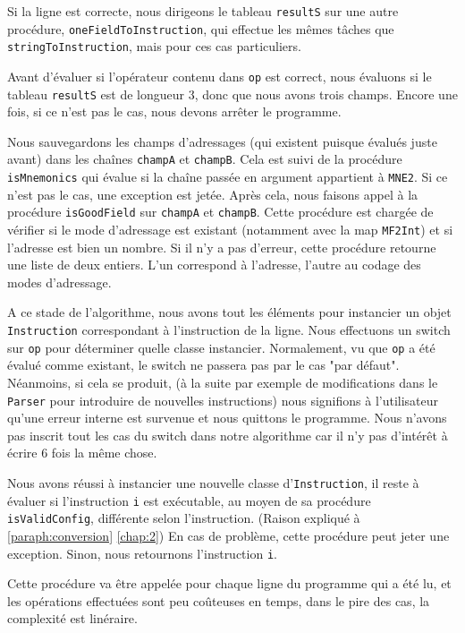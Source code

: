 \documentclass[hidelinks]{report}
\begin{document}
Si la ligne est correcte, nous dirigeons le tableau \texttt{resultS} sur une autre procédure, \texttt{oneFieldToInstruction}, qui effectue les mêmes tâches que \texttt{stringToInstruction}, mais pour ces cas particuliers.

Avant d'évaluer si l'opérateur contenu dans \texttt{op} est correct, nous évaluons si le tableau \texttt{resultS} est de longueur 3, donc que nous avons trois champs. Encore une fois, si ce n'est pas le cas, nous devons arrêter le programme.

Nous sauvegardons les champs d'adressages (qui existent puisque évalués juste avant) dans les chaînes \texttt{champA} et \texttt{champB}. Cela est suivi de la procédure \texttt{isMnemonics} qui évalue si la chaîne passée en argument appartient à \texttt{MNE2}. Si ce n'est pas le cas, une exception est jetée. Après cela, nous faisons appel à la procédure \texttt{isGoodField} sur \texttt{champA} et \texttt{champB}. Cette procédure est chargée de vérifier si le mode d'adressage est existant (notamment avec la map \texttt{MF2Int}) et si l'adresse est bien un nombre. Si il n'y a pas d'erreur, cette procédure retourne une liste de deux entiers. L'un correspond à l'adresse, l'autre au codage des modes d'adressage. 

A ce stade de l'algorithme, nous avons tout les éléments pour instancier un objet \texttt{Instruction} correspondant à l'instruction de la ligne. Nous effectuons un switch sur \texttt{op} pour déterminer quelle classe instancier. Normalement, vu que \texttt{op} a été évalué comme existant, le switch ne passera pas par le cas "par défaut". Néanmoins, si cela se produit, (à la suite par exemple de modifications dans le \texttt{Parser} pour introduire de nouvelles instructions) nous signifions à l'utilisateur qu'une erreur interne est survenue et nous quittons le programme. Nous n'avons pas inscrit tout les cas du switch dans notre algorithme car il n'y pas d'intérêt à écrire 6 fois la même chose.

Nous avons réussi à instancier une nouvelle classe d'\texttt{Instruction}, il reste à évaluer si l'instruction \texttt{i} est exécutable, au moyen de sa procédure \texttt{isValidConfig}, différente selon l'instruction. (Raison expliqué à \autoref{paraph:conversion} \autoref{chap:2}) En cas de problème, cette procédure peut jeter une exception. Sinon, nous retournons l'instruction \texttt{i}.

Cette procédure va être appelée pour chaque ligne du programme qui a été lu, et les opérations effectuées sont peu coûteuses en temps, dans le pire des cas, la complexité est linéraire. 
\end{document}
